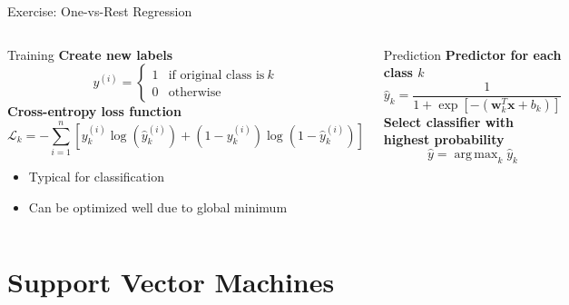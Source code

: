 \documentclass[
                en,
                ]{sdqbeamer}
\DeclareMathOperator*{\argmax}{arg\,max}
\begin{document}
\begin{frame}{Exercise: One-vs-Rest Regression}
    \begin{columns}
        \column{\kitthreecolumns}
        \begin{greenblock}{Training}
            \textbf{Create new labels}
            \begin{equation*}
                y^{(i)} =
                \begin{cases}
                1 & \text{if original class is}~k\\
                0 & \text{otherwise}
                \end{cases}
            \end{equation*}
            \textbf{Cross-entropy loss function}
            \begin{equation*}
                \mathcal{L}_k = - \sum_{i=1}^{n} \left[ y_k^{(i)}
                \log(\hat{y}_k^{(i)}) + (1-y_k^{(i)}) \log(1-\hat{y}_k^{(i)}) \right]
            \end{equation*}
            \begin{itemize}
                \item Typical for classification
                \item Can be optimized well due to global minimum
            \end{itemize}
        \end{greenblock}

        \column{\kitthreecolumns}
        \begin{greenblock}{Prediction}
            \textbf{Predictor for each class $k$}
            \begin{equation*}
                \hat{y}_k = \frac{1}{1 + \exp[-(\mathbf{w}_k^T \mathbf{x} +
                b_k)]}
            \end{equation*}
            \textbf{Select classifier with highest probability}
            \begin{equation*}
                \hat{y} = \argmax_k \hat{y}_k
            \end{equation*}
            
        \end{greenblock}
    \end{columns}
\end{frame}


\section{Support Vector Machines}
\end{document}
